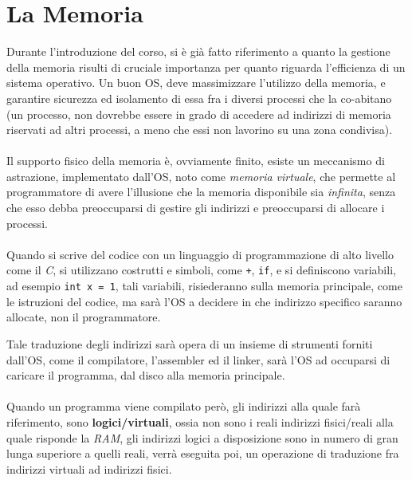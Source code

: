 \documentclass[12pt, letterpaper]{article}
\newcommand{\code}[1]{\colorbox{light-gray}{\texttt{#1}}}
\newcommand{\acc}{\\\hphantom{}\\}
\begin{document}
\section{La Memoria}
Durante l'introduzione del corso, si è già fatto riferimento a quanto la gestione della memoria risulti di cruciale 
importanza per quanto riguarda l'efficienza di un sistema operativo. Un buon OS, deve massimizzare l'utilizzo della 
memoria, e garantire sicurezza ed isolamento di essa fra i diversi processi che la co-abitano (un processo, non 
dovrebbe essere in grado di accedere ad indirizzi di memoria riservati ad altri processi, a meno che essi non lavorino 
su una zona condivisa).\acc 
Il supporto fisico della memoria è, ovviamente finito, esiste un meccanismo di astrazione, implementato 
dall'OS, noto come \textit{memoria virtuale}, che permette al programmatore di avere l'illusione che la memoria 
disponibile sia \textit{infinita}, senza che esso debba preoccuparsi di gestire gli indirizzi e preoccuparsi di 
allocare i processi.\acc 
Quando si scrive del codice con un linguaggio di programmazione di alto livello come il \textit{C}, si utilizzano 
costrutti e simboli, come \code{+}, \code{if}, e si definiscono variabili, ad esempio \code{int x = 1}, tali variabili, 
risiederanno sulla memoria principale, come le istruzioni del codice, ma sarà l'OS a decidere in che indirizzo specifico saranno allocate, non il 
programmatore.

Tale traduzione degli indirizzi sarà opera di un insieme di strumenti forniti dall'OS, come il compilatore, l'assembler 
ed il linker, sarà l'OS ad occuparsi di caricare il programma, dal disco alla memoria principale.\acc 
Quando un programma viene compilato però, gli indirizzi alla quale farà riferimento, sono \textbf{logici/virtuali}, ossia 
non sono i reali indirizzi fisici/reali alla quale risponde la \textit{RAM}, gli indirizzi logici a disposizione sono in numero di gran 
lunga superiore a quelli reali, verrà eseguita poi, un operazione di traduzione fra indirizzi virtuali ad indirizzi fisici.
\end{document}
